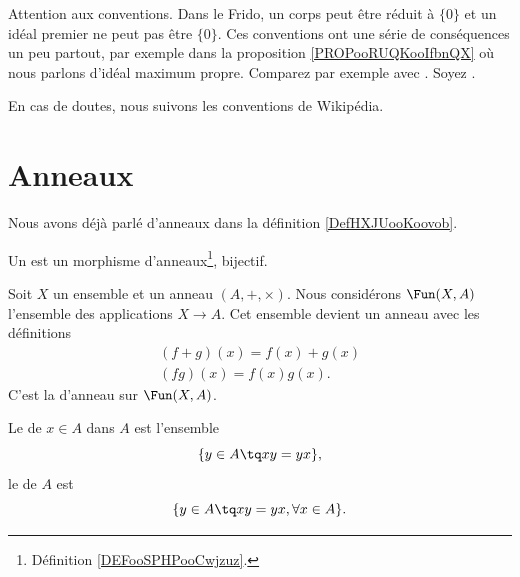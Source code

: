 
Attention aux conventions. Dans le Frido, un corps peut être réduit à \( \{ 0 \}\) et un idéal premier ne peut pas être \( \{ 0 \}\). Ces conventions ont une série de conséquences un peu partout, par exemple dans la proposition \ref{PROPooRUQKooIfbnQX} où nous parlons d'idéal maximum propre. Comparez par exemple avec \cite{ooWEUDooQybvIx}. Soyez .

En cas de doutes, nous suivons les conventions de Wikipédia.

\section{Anneaux}

Nous avons déjà parlé d'anneaux dans la définition \ref{DefHXJUooKoovob}.

\begin{definition}      \label{DEFooKWKGooIOwGTA}
	Un  est un morphisme d'anneaux\footnote{Définition \ref{DEFooSPHPooCwjzuz}.}, bijectif.
\end{definition}

Soit \( X\) un ensemble et un anneau \( (A, +, \times)\). Nous considérons \( \Fun(X,A)\) l'ensemble des applications \( X\to A\). Cet ensemble devient un anneau avec les définitions
\begin{subequations}
	\begin{align}
		(f+g)(x)=f(x)+g(x) \\
		(fg)(x)=f(x)g(x).
	\end{align}
\end{subequations}
C'est la  d'anneau sur \( \Fun(X,A)\).

\begin{definition}
	Le  de \( x\in A\) dans \( A\) est l'ensemble
	\begin{equation}
		\{ y\in A\tq xy=yx \},
	\end{equation}
	le  de \( A\) est
	\begin{equation}
		\{ y\in A\tq xy=yx,\forall x\in A \}.
	\end{equation}
\end{definition}

